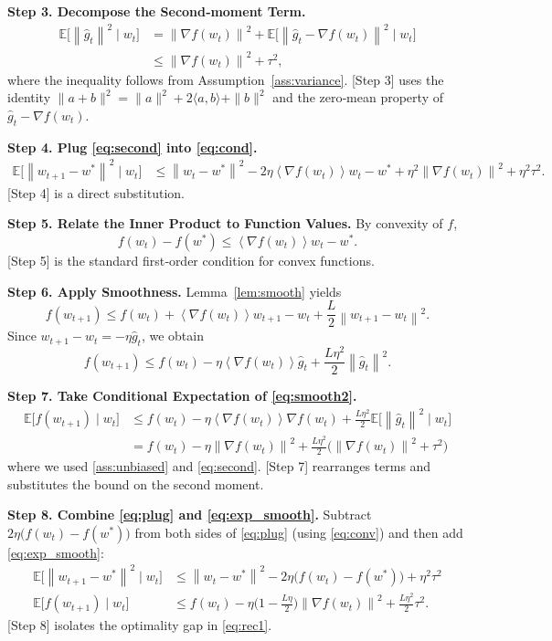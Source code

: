 \documentclass{article}
\newcommand{\E}{\mathbb{E}}
\newcommand{\norm}[1]{\left\lVert #1\right\rVert}
\newcommand{\inner}[1]{\left\langle #1\right\rangle}
\begin{document}
\bigskip
\noindent\textbf{Step 3. Decompose the Second‑moment Term.}
\begin{align}
\E\!\big[\norm{\hat g_t}^{2}\mid w_t\big]
&=\norm{\nabla f(w_t)}^{2}
+\E\!\big[\norm{\hat g_t-\nabla f(w_t)}^{2}\mid w_t\big] \nonumber\\
&\le \norm{\nabla f(w_t)}^{2}+\tau^{2}, \tag{3}\label{eq:second}
\end{align}
where the inequality follows from Assumption~\ref{ass:variance}.  
[Step 3] uses the identity $\|a+b\|^{2}=\|a\|^{2}+2\langle a,b\rangle+\|b\|^{2}$ and the zero‑mean property of $\hat g_t-\nabla f(w_t)$.

\bigskip
\noindent\textbf{Step 4. Plug \eqref{eq:second} into \eqref{eq:cond}.}
\begin{align}
\E\!\big[\norm{w_{t+1}-w^{*}}^{2}\mid w_t\big]
&\le \norm{w_t-w^{*}}^{2}
-2\eta\inner{\nabla f(w_t)}{w_t-w^{*}}
+\eta^{2}\norm{\nabla f(w_t)}^{2}
+\eta^{2}\tau^{2}. \tag{4}\label{eq:plug}
\end{align}
[Step 4] is a direct substitution.

\bigskip
\noindent\textbf{Step 5. Relate the Inner Product to Function Values.}  
By convexity of $f$,
\[
f(w_t)-f(w^{*})\le \inner{\nabla f(w_t)}{w_t-w^{*}}. \tag{5}\label{eq:conv}
\]
[Step 5] is the standard first‑order condition for convex functions.

\bigskip
\noindent\textbf{Step 6. Apply Smoothness.}  
Lemma~\ref{lem:smooth} yields
\[
f(w_{t+1})\le f(w_t)+\inner{\nabla f(w_t)}{w_{t+1}-w_t}
+\frac{L}{2}\norm{w_{t+1}-w_t}^{2}. \tag{6}\label{eq:smooth}
\]
Since $w_{t+1}-w_t=-\eta\hat g_t$, we obtain
\[
f(w_{t+1})\le f(w_t)-\eta\inner{\nabla f(w_t)}{\hat g_t}
+\frac{L\eta^{2}}{2}\norm{\hat g_t}^{2}. \tag{7}\label{eq:smooth2}
\]

\bigskip
\noindent\textbf{Step 7. Take Conditional Expectation of \eqref{eq:smooth2}.}
\begin{align}
\E\!\big[f(w_{t+1})\mid w_t\big]
&\le f(w_t)-\eta\inner{\nabla f(w_t)}{\nabla f(w_t)}
+\frac{L\eta^{2}}{2}\E\!\big[\norm{\hat g_t}^{2}\mid w_t\big] \nonumber\\
&= f(w_t)-\eta\norm{\nabla f(w_t)}^{2}
+\frac{L\eta^{2}}{2}\big(\norm{\nabla f(w_t)}^{2}+\tau^{2}\big) \tag{8}\label{eq:exp_smooth}
\end{align}
where we used \ref{ass:unbiased} and \eqref{eq:second}.  
[Step 7] rearranges terms and substitutes the bound on the second moment.

\bigskip
\noindent\textbf{Step 8. Combine \eqref{eq:plug} and \eqref{eq:exp_smooth}.}  
Subtract $2\eta\big(f(w_t)-f(w^{*})\big)$ from both sides of \eqref{eq:plug} (using \eqref{eq:conv}) and then add \eqref{eq:exp_smooth}:
\begin{align}
\E\!\big[\norm{w_{t+1}-w^{*}}^{2}\mid w_t\big]
&\le \norm{w_t-w^{*}}^{2}
-2\eta\big(f(w_t)-f(w^{*})\big)
+\eta^{2}\tau^{2}
\tag{9}\label{eq:rec1}\\
\E\!\big[f(w_{t+1})\mid w_t\big]
&\le f(w_t)-\eta\big(1-\tfrac{L\eta}{2}\big)\norm{\nabla f(w_t)}^{2}
+\frac{L\eta^{2}}{2}\tau^{2}. \tag{10}\label{eq:rec2}
\end{align}
[Step 8] isolates the optimality gap in \eqref{eq:rec1}.
\end{document}
